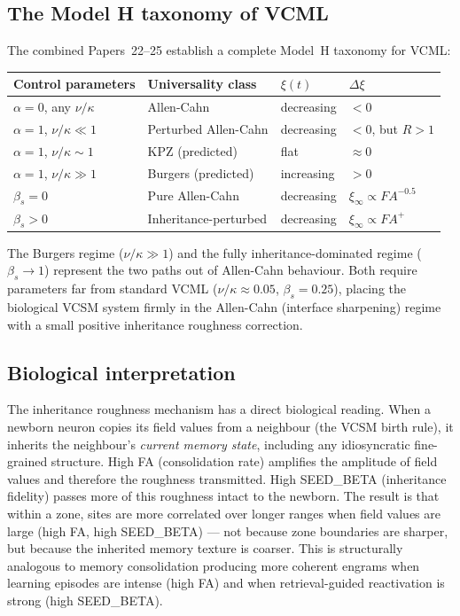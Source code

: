 \documentclass[11pt]{article}
\begin{document}
\subsection{The Model H taxonomy of VCML}

The combined Papers~22--25 establish a complete Model~H taxonomy for VCML:

\begin{center}
\begin{tabular}{llll}
\toprule
Control parameters & Universality class & $\xi(t)$ & $\Delta\xi$ \\
\midrule
$\alpha=0$, any $\nu/\kappa$ & Allen-Cahn & decreasing & $< 0$ \\
$\alpha=1$, $\nu/\kappa \ll 1$ & Perturbed Allen-Cahn & decreasing & $< 0$, but $R>1$ \\
$\alpha=1$, $\nu/\kappa \sim 1$ & KPZ (predicted) & flat & $\approx 0$ \\
$\alpha=1$, $\nu/\kappa \gg 1$ & Burgers (predicted) & increasing & $> 0$ \\
\hline
$\beta_s = 0$ & Pure Allen-Cahn & decreasing & $\xi_\infty \propto FA^{-0.5}$ \\
$\beta_s > 0$ & Inheritance-perturbed & decreasing & $\xi_\infty \propto FA^{+}$ \\
\bottomrule
\end{tabular}
\end{center}

The Burgers regime ($\nu/\kappa \gg 1$) and the fully inheritance-dominated
regime ($\beta_s \to 1$) represent the two paths out of Allen-Cahn behaviour.
Both require parameters far from standard VCML ($\nu/\kappa \approx 0.05$,
$\beta_s = 0.25$), placing the biological VCSM system firmly in the
Allen-Cahn (interface sharpening) regime with a small positive inheritance
roughness correction.

\subsection{Biological interpretation}

The inheritance roughness mechanism has a direct biological reading.
When a newborn neuron copies its field values from a neighbour
(the VCSM birth rule), it inherits the neighbour's \emph{current memory
state}, including any idiosyncratic fine-grained structure.
High FA (consolidation rate) amplifies the amplitude of field values
and therefore the roughness transmitted.
High SEED\_BETA (inheritance fidelity) passes more of this roughness
intact to the newborn.
The result is that within a zone, sites are more correlated over
longer ranges when field values are large (high FA, high SEED\_BETA)
--- not because zone boundaries are sharper, but because the inherited
memory texture is coarser.
This is structurally analogous to memory consolidation producing more
coherent engrams when learning episodes are intense (high FA) and
when retrieval-guided reactivation is strong (high SEED\_BETA).
\end{document}
